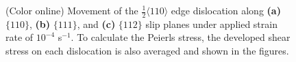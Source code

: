 \documentclass[applsci,article,submit,pdftex,moreauthors]{Definitions/mdpi}
\newcommand{\?}{\stackrel{?}{=}}
\begin{document}
\begin{figure}[h!]
\centering
{}
\hfill
{}
\hfill
{}

\caption{(Color online) Movement of the $\frac{1}{2} \langle 110 \rangle$ edge dislocation along \textbf{(a)} $\{ 110 \}$, \textbf{(b)} $\{ 111 \}$, and \textbf{(c)} $\{112\}$ slip planes under applied strain rate of $10^{-4}$ s$^{-1}$. To calculate the Peierls stress, the developed shear stress on each dislocation is also averaged and shown in the figures.}
\label{Fig:Disloc}
\end{figure}
\end{document}

